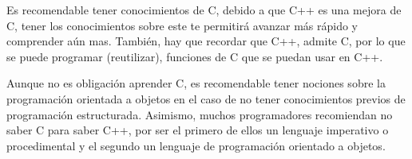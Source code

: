 Es recomendable tener conocimientos de C, debido a que C++ es una mejora de C, tener los
conocimientos sobre este te permitirá avanzar más rápido y comprender aún mas. También, hay
que recordar que C++, admite C, por lo que se puede programar (reutilizar), funciones de C que se
puedan usar en C++.

Aunque no es obligación aprender C, es recomendable tener nociones sobre la programación
orientada a objetos en el caso de no tener conocimientos previos de programación estructurada.
Asimismo, muchos programadores recomiendan no saber C para saber C++, por ser el primero de
ellos un lenguaje imperativo o procedimental y el segundo un lenguaje de programación orientado a
objetos.
